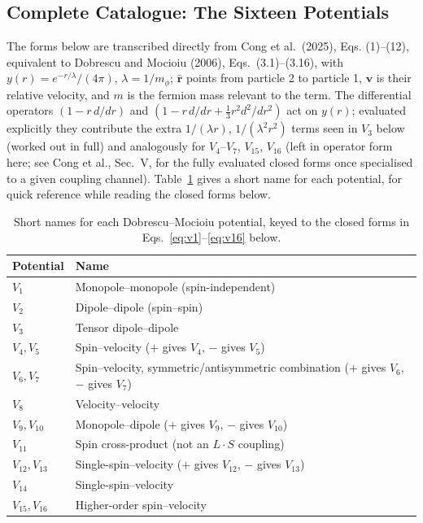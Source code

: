 \documentclass[main]{subfiles}
\begin{document}
\subsection{Complete Catalogue: The Sixteen Potentials}
\label{sec:dm-catalogue}

The forms below are transcribed directly from Cong et al.\ (2025), Eqs.
(1)--(12), equivalent to Dobrescu and Mocioiu (2006), Eqs.\
(3.1)--(3.16), with $y(r)=e^{-r/\lambda}/(4\pi)$, $\lambda=1/m_\phi$;
$\hat{\mathbf r}$ points from particle 2 to particle 1, $\mathbf v$ is their
relative velocity, and $m$ is the fermion mass relevant to the term. The
differential operators $(1-r\,d/dr)$ and
$(1-r\,d/dr+\tfrac13r^2d^2/dr^2)$ act on $y(r)$; evaluated explicitly they
contribute the extra $1/(\lambda r)$, $1/(\lambda^2r^2)$ terms seen in $V_3$
below (worked out in full) and analogously for $V_4$--$V_7$, $V_{15}$,
$V_{16}$ (left in operator form here; see Cong et al., Sec.~V, for the
fully evaluated closed forms once specialised to a given coupling channel).
Table~\ref{tab:dm-names} gives a short name for each potential, for quick
reference while reading the closed forms below.

\begin{table}[h]
\centering
\begin{tabular}{@{}l>{\raggedright\arraybackslash}p{9cm}@{}}
\toprule
Potential & Name \\
\midrule
$V_1$ & Monopole--monopole (spin-independent) \\
$V_2$ & Dipole--dipole (spin--spin) \\
$V_3$ & Tensor dipole--dipole \\
$V_4, V_5$ & Spin--velocity ($+$ gives $V_4$, $-$ gives $V_5$) \\
$V_6, V_7$ & Spin--velocity, symmetric/antisymmetric combination ($+$ gives $V_6$, $-$ gives $V_7$) \\
$V_8$ & Velocity--velocity \\
$V_9, V_{10}$ & Monopole--dipole ($+$ gives $V_9$, $-$ gives $V_{10}$) \\
$V_{11}$ & Spin cross-product (not an $L\cdot S$ coupling) \\
$V_{12}, V_{13}$ & Single-spin--velocity ($+$ gives $V_{12}$, $-$ gives $V_{13}$) \\
$V_{14}$ & Single-spin--velocity \\
$V_{15}, V_{16}$ & Higher-order spin--velocity \\
\bottomrule
\end{tabular}
\caption{Short names for each Dobrescu--Mocioiu potential, keyed to the closed forms in Eqs.~\eqref{eq:v1}--\eqref{eq:v16} below.}
\label{tab:dm-names}
\end{table}
\end{document}
